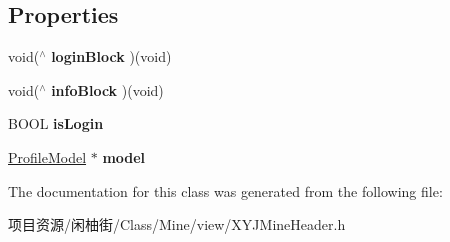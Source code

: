 \subsection*{Properties}
\begin{DoxyCompactItemize}
\item 
\mbox{\label{interface_x_y_j_mine_header_a28982356bc45772a2e841adc9c1e205c}} 
void($^\wedge$ {\bfseries login\+Block} )(void)
\item 
\mbox{\label{interface_x_y_j_mine_header_ad8dcb092222949a88824fbd15f8e8bbd}} 
void($^\wedge$ {\bfseries info\+Block} )(void)
\item 
\mbox{\label{interface_x_y_j_mine_header_a0a5c4477f46df9f2425dcad7cf146965}} 
B\+O\+OL {\bfseries is\+Login}
\item 
\mbox{\label{interface_x_y_j_mine_header_a4646c1d9ad0b69e1a71e2728a8dfabbd}} 
\mbox{\hyperlink{interface_profile_model}{Profile\+Model}} $\ast$ {\bfseries model}
\end{DoxyCompactItemize}


The documentation for this class was generated from the following file\+:\begin{DoxyCompactItemize}
\item 
项目资源/闲柚街/\+Class/\+Mine/view/X\+Y\+J\+Mine\+Header.\+h\end{DoxyCompactItemize}

